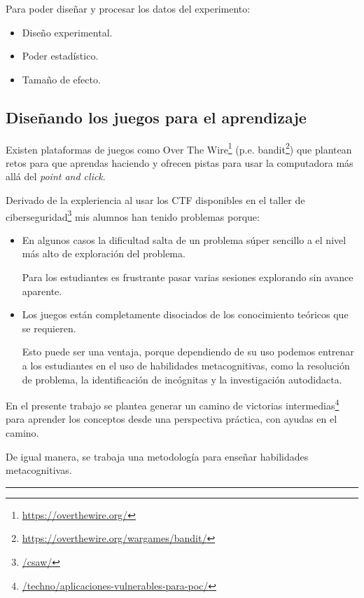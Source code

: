 \documentclass[
  12,
]{scrartcl}
\DeclareRobustCommand{\href}[2]{#2\footnote{\url{#1}}}
\providecommand{\tightlist}{%
  \setlength{\itemsep}{0pt}\setlength{\parskip}{0pt}}
\begin{document}
Para poder diseñar y procesar los datos del experimento:

\begin{itemize}
\tightlist
\item
  Diseño experimental.
\item
  Poder estadístico.
\item
  Tamaño de efecto.
\end{itemize}

\hypertarget{diseuxf1ando-los-juegos-para-el-aprendizaje}{%
\subsection{Diseñando los juegos para el
aprendizaje}\label{diseuxf1ando-los-juegos-para-el-aprendizaje}}

Existen plataformas de juegos como \href{https://overthewire.org/}{Over
The Wire} (p.e. \href{https://overthewire.org/wargames/bandit/}{bandit})
que plantean retos para que aprendas haciendo y ofrecen pistas para usar
la computadora más allá del \emph{point and click}.

Derivado de la expleriencia al usar los CTF disponibles en el
\href{/csaw/}{taller de ciberseguridad} mis alumnos han tenido problemas
porque:

\begin{itemize}
\item
  En algunos casos la dificultad salta de un problema súper sencillo a
  el nivel más alto de exploración del problema.

  Para los estudiantes es frustrante pasar varias sesiones explorando
  sin avance aparente.
\item
  Los juegos están completamente disociados de los conocimiento teóricos
  que se requieren.

  Esto puede ser una ventaja, porque dependiendo de su uso podemos
  entrenar a los estudiantes en el uso de habilidades metacognitivas,
  como la resolución de problema, la identificación de incógnitas y la
  investigación autodidacta.
\end{itemize}

En el presente trabajo se plantea
\href{/techno/aplicaciones-vulnerables-para-poc/}{generar un camino de
victorias intermedias} para aprender los conceptos desde una perspectiva
práctica, con ayudas en el camino.

De igual manera, se trabaja una metodología para enseñar habilidades
metacognitivas.

\begin{center}\rule{0.5\linewidth}{0.5pt}\end{center}
\end{document}
